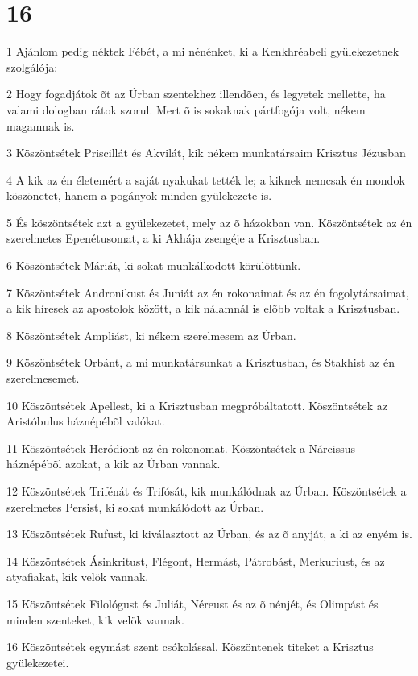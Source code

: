 \chapter{16}

\par 1 Ajánlom pedig néktek Fébét, a mi nénénket, ki a Kenkhréabeli gyülekezetnek szolgálója:
\par 2 Hogy fogadjátok õt az Úrban szentekhez illendõen, és legyetek mellette, ha valami dologban rátok szorul. Mert õ is sokaknak pártfogója volt, nékem magamnak is.
\par 3 Köszöntsétek Priscillát és Akvilát, kik nékem munkatársaim Krisztus Jézusban
\par 4 A kik az én életemért a saját nyakukat tették le; a kiknek nemcsak én mondok köszönetet, hanem a pogányok minden gyülekezete is.
\par 5 És köszöntsétek azt a gyülekezetet, mely az õ házokban van. Köszöntsétek az én szerelmetes Epenétusomat, a ki Akhája zsengéje a Krisztusban.
\par 6 Köszöntsétek Máriát, ki sokat munkálkodott körülöttünk.
\par 7 Köszöntsétek Andronikust és Juniát az én rokonaimat és az én fogolytársaimat, a kik híresek az apostolok között, a kik nálamnál is elõbb voltak a Krisztusban.
\par 8 Köszöntsétek Ampliást, ki nékem szerelmesem az Úrban.
\par 9 Köszöntsétek Orbánt, a mi munkatársunkat a Krisztusban, és Stakhist az én szerelmesemet.
\par 10 Köszöntsétek Apellest, ki a Krisztusban megpróbáltatott. Köszöntsétek az Aristóbulus háznépébõl valókat.
\par 11 Köszöntsétek Heródiont az én rokonomat. Köszöntsétek a Nárcissus háznépébõl azokat, a kik az Úrban vannak.
\par 12 Köszöntsétek Trifénát és Trifósát, kik munkálódnak az Úrban. Köszöntsétek a szerelmetes Persist, ki sokat munkálódott az Úrban.
\par 13 Köszöntsétek Rufust, ki kiválasztott az Úrban, és az õ anyját, a ki az enyém is.
\par 14 Köszöntsétek Ásinkritust, Flégont, Hermást, Pátrobást, Merkuriust, és az atyafiakat, kik velök vannak.
\par 15 Köszöntsétek Filológust és Juliát, Néreust és az õ nénjét, és Olimpást és minden szenteket, kik velök vannak.
\par 16 Köszöntsétek egymást szent csókolással. Köszöntenek titeket a Krisztus gyülekezetei.
